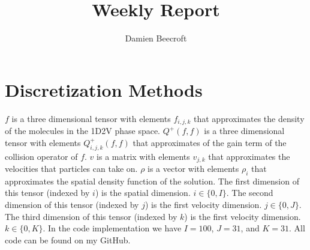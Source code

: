\documentclass{article}
\title{Weekly Report}
\author{Damien Beecroft}
\begin{document}
\maketitle
\section{Discretization Methods}
$f$ is a three dimensional tensor with elements $f_{i,j,k}$ that approximates the density of the molecules in the 1D2V phase space. $Q^+(f,f)$ is a three dimensional tensor with elements $Q^+_{i,j,k}(f,f)$ that approximates of the gain term of the collision operator of $f$. $v$ is a matrix with elements $v_{j,k}$ that approximates the velocities that particles can take on. $\rho$ is a vector with elements $\rho_i$ that approximates the spatial density function of the solution. The first dimension of this tensor (indexed by $i$) is the spatial dimension. $i \in \{0,I\}$. The second dimension of this tensor (indexed by $j$) is the first velocity dimension. $j \in \{0,J\}$. The third dimension of this tensor (indexed by $k$) is the first velocity dimension. $k \in \{0,K\}$. In the code implementation we have $I=100$, $J=31$, and $K=31$. All code can be found on my GitHub.
\end{document}
